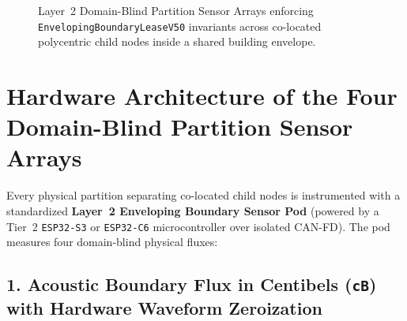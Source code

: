 \begin{figure}[htbp]
{%
}
\caption{Layer~2 Domain-Blind Partition Sensor Arrays enforcing \texttt{EnvelopingBoundaryLeaseV50} invariants across co-located polycentric child nodes inside a shared building envelope.}
\label{fig:l2-enveloping-partition-array}
\end{figure}

\section{Hardware Architecture of the Four Domain-Blind Partition Sensor Arrays}
\label{sec:l2-four-partition-sensor-arrays}

Every physical partition separating co-located child nodes is instrumented with a standardized \textbf{Layer~2 Enveloping Boundary Sensor Pod} (powered by a Tier~2 \texttt{ESP32-S3} or \texttt{ESP32-C6} microcontroller over isolated CAN-FD). The pod measures four domain-blind physical fluxes:

\subsection{1. Acoustic Boundary Flux in Centibels (\texttt{cB}) with Hardware Waveform Zeroization}

